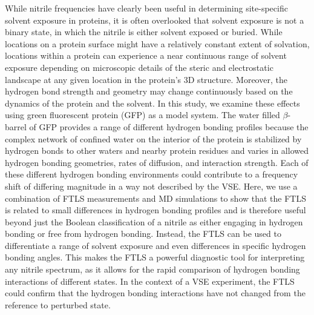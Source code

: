 While nitrile frequencies have clearly been useful in determining site-specific solvent exposure in proteins, it is often overlooked that solvent exposure is not a binary state, in which the nitrile is either solvent exposed or buried.
While locations on a protein surface might have a relatively constant extent of solvation, locations within a protein can experience a near continuous range of solvent exposure depending on microscopic details of the steric and electrostatic landscape at any given location in the protein's 3D structure.
Moreover, the hydrogen bond strength and geometry may change continuously based on the dynamics of the protein and the solvent.
In this study, we examine these effects using green fluorescent protein (GFP) as a model system.
The water filled $\beta$-barrel of GFP provides a range of different hydrogen bonding profiles because the complex network of confined water on the interior of the protein is stabilized by hydrogen bonds to other waters and nearby protein residues and varies in allowed hydrogen bonding geometries, rates of diffusion, and interaction strength.
Each of these different hydrogen bonding environments could contribute to a frequency shift of differing magnitude in a way not described by the VSE.
Here, we use a combination of FTLS measurements and MD simulations to show that the FTLS is related to small differences in hydrogen bonding profiles and is therefore useful beyond just the Boolean classification of a nitrile as either engaging in hydrogen bonding or free from hydrogen bonding.
Instead, the FTLS can be used to differentiate a range of solvent exposure and even differences in specific hydrogen bonding angles.
This makes the FTLS a powerful diagnostic tool for interpreting any nitrile spectrum, as it allows for the rapid comparison of hydrogen bonding interactions of different states.
In the context of a VSE experiment, the FTLS could confirm that the hydrogen bonding interactions have not changed from the reference to perturbed state. 

